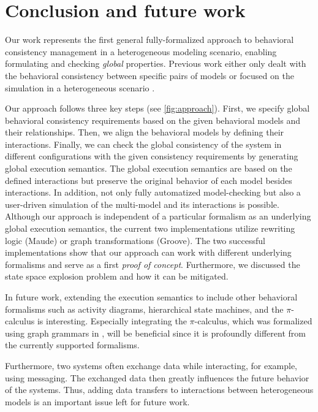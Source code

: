 \documentclass{jot}
\begin{document}
\section{Conclusion and future work} \label{sec:conclusion_and_future_work}
Our work represents the first general fully-formalized approach to behavioral consistency management in a heterogeneous modeling scenario, enabling formulating and checking \emph{global} properties.
Previous work either only dealt with the behavioral consistency between specific pairs of models \cite{yaoConsistencyCheckingUML2006, kusterExplicitBehavioralConsistency2003} or focused on the simulation in a heterogeneous scenario \cite{deantoniModelingBehavioralSemantics2016, varalarsenBCoolBehavioralCoordination2016, ekerTamingHeterogeneityPtolemy2003, leeDisciplinedHeterogeneousModeling2010}.

Our approach follows three key steps (see \autoref{fig:approach}).
First, we specify global behavioral consistency requirements based on the given behavioral models and their relationships. 
Then, we align the behavioral models by defining their interactions.
Finally, we can check the global consistency of the system in different configurations with the given consistency requirements by generating global execution semantics.
The global execution semantics are based on the defined interactions but preserve the original behavior of each model besides interactions.
In addition, not only fully automatized model-checking but also a user-driven simulation of the multi-model and its interactions is possible.
Although our approach is independent of a particular formalism as an underlying global execution semantics, the current two implementations utilize rewriting logic (Maude) or graph transformations (Groove).
The two successful implementations show that our approach can work with different underlying formalisms and serve as a first \textit{proof of concept}.
Furthermore, we discussed the state space explosion problem and how it can be mitigated.

In future work, extending the execution semantics to include other behavioral formalisms such as activity diagrams, hierarchical state machines, and the $\pi$-calculus is interesting.
Especially integrating the $\pi$-calculus, which was formalized using graph grammars in \cite{gadducciGraphRewritingPcalculus2007}, will be beneficial since it is profoundly different from the currently supported formalisms.

Furthermore, two systems often exchange data while interacting, for example, using messaging.
The exchanged data then greatly influences the future behavior of the systems.
Thus, adding data transfers to interactions between heterogeneous models is an important issue left for future work.
\end{document}
